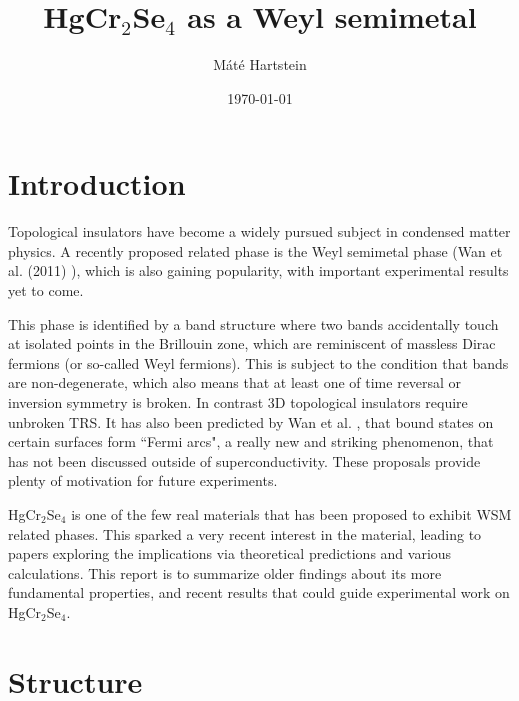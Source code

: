 \documentclass[preprint,pre,floats,aps,amsmath,amssymb]{revtex4}
\begin{document}
\title{HgCr$_2$Se$_4$ as a Weyl semimetal}
\author{M\'{a}t\'{e} Hartstein}
\date{\today}

\clearpage\maketitle
\thispagestyle{empty}


\section{Introduction}
\label{sec:intro}

Topological insulators have become a widely pursued subject in condensed matter physics. A recently proposed related phase is the Weyl semimetal phase (Wan et al. (2011) \cite{wan}), which is also gaining popularity, with important experimental results yet to come.
 
This phase is identified by a band structure where two bands accidentally touch at isolated points in the Brillouin zone, which are reminiscent of massless Dirac fermions (or so-called Weyl fermions). This is subject to the condition that bands are non-degenerate, which also means that at least one of time reversal or inversion symmetry is broken. In contrast 3D topological insulators require unbroken TRS.
It has also been predicted by Wan et al. \cite{wan}, that bound states on certain surfaces form ``{Fermi arcs}", a really new and striking phenomenon, that has not been discussed outside of superconductivity. These proposals provide plenty of motivation for future experiments.
 
HgCr$_2$Se$_4$ is one of the few real materials that has been proposed to exhibit WSM related phases. This sparked a very recent interest in the material, leading to papers exploring the implications via theoretical predictions and various calculations. This report is to summarize older findings about its more fundamental properties, and recent results that could guide experimental work on HgCr$_2$Se$_4$.



\section{Structure}
\end{document}
